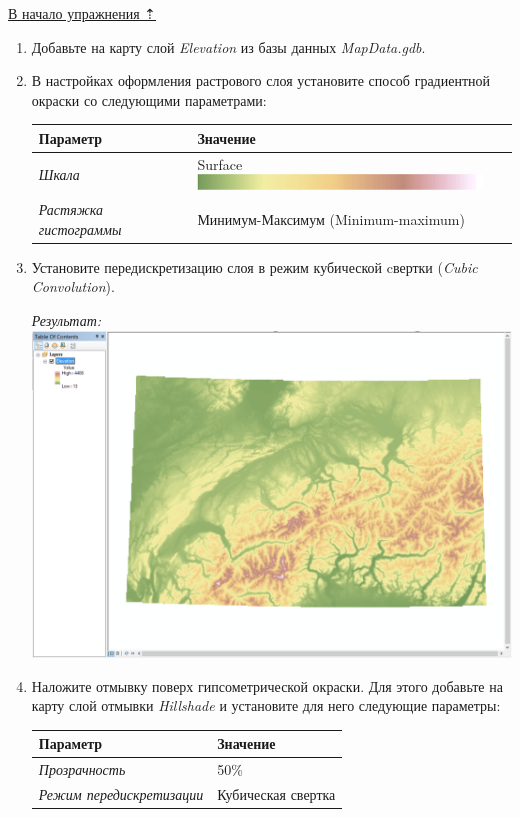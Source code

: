 \documentclass[]{book}
\theoremstyle{definition}
\theoremstyle{definition}
\theoremstyle{definition}
\theoremstyle{remark}
\begin{document}
\protect\hyperlink{map-design-general}{В начало упражнения ⇡}

\begin{enumerate}
\def\labelenumi{\arabic{enumi}.}
\item
  Добавьте на карту слой \emph{Elevation} из базы данных
  \emph{MapData.gdb}.
\item
  В настройках оформления растрового слоя установите способ градиентной
  окраски со следующими параметрами:

  \begin{longtable}[]{@{}ll@{}}
  \toprule
  Параметр & Значение\tabularnewline
  \midrule
  \endhead
  \emph{Шкала} & Surface
  \includegraphics{images/Ex02/image11.png}\tabularnewline
  \emph{Растяжка гистограммы} & Минимум-Максимум
  (Minimum-maximum)\tabularnewline
  \bottomrule
  \end{longtable}
\item
  Установите передискретизацию слоя в режим кубической cвертки
  (\emph{Cubic Convolution}).

  \emph{Результат:} \includegraphics{images/Ex02/image12.png}
\item
  Наложите отмывку поверх гипсометрической окраски. Для этого добавьте
  на карту слой отмывки \emph{Hillshade} и установите для него следующие
  параметры:

  \begin{longtable}[]{@{}ll@{}}
  \toprule
  Параметр & Значение\tabularnewline
  \midrule
  \endhead
  \emph{Прозрачность} & 50\%\tabularnewline
  \emph{Режим передискретизации} & Кубическая свертка\tabularnewline
  \bottomrule
  \end{longtable}


\end{enumerate}
\end{document}
